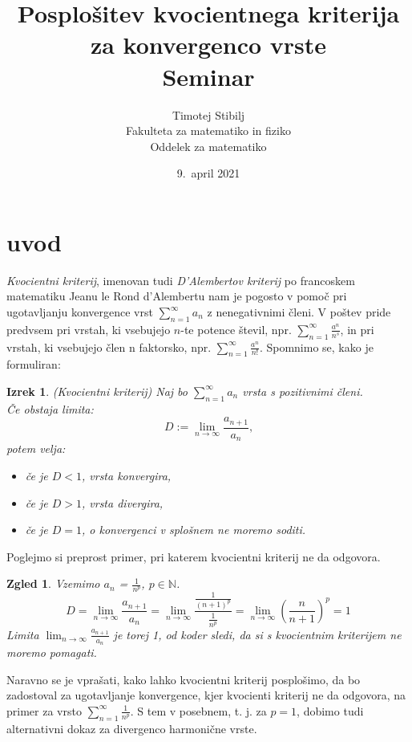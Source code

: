 \documentclass[a4paper,12pt]{article}
\title{Posplošitev kvocientnega kriterija za konvergenco vrste \\ 
\Large Seminar}
\author{Timotej Stibilj \\
Fakulteta za matematiko in fiziko \\
Oddelek za matematiko}
\date{9.\ april 2021}
\def\N{\mathbb{N}} %
\newtheorem{izrek}{Izrek}
\newtheorem{zgled}{Zgled}
\begin{document}
\maketitle

\section{uvod}

\emph{Kvocientni kriterij}, imenovan tudi \emph{D'Alembertov kriterij} po francoskem matematiku Jeanu le Rond d'Alembertu
nam je pogosto v pomoč pri ugotavljanju konvergence vrst $\sum_{n = 1}^{\infty}{a_n}$ z nenegativnimi členi. 
V poštev pride predvsem pri vrstah, ki vsebujejo $n$-te potence števil, npr. $\sum_{n = 1}^{\infty}{\frac{a^n}{n^s}}$, 
in pri vrstah, ki vsebujejo člen n faktorsko, npr. $\sum_{n = 1}^{\infty}{\frac{a^n}{n!}}$.
Spomnimo se, kako je formuliran:\\

\noindent
\begin{izrek}(Kvocientni kriterij) Naj bo $\sum_{n = 1}^{\infty}{a_n}$ vrsta s pozitivnimi členi.\\
    Če obstaja limita:
    \[
        D := \lim_{n \to \infty} \frac{a_{n + 1}}{a_n} \text{,}
    \]
    potem velja:
    \begin{itemize}
        \item če je $ D < 1 $, vrsta konvergira,
        \item če je $D > 1$, vrsta divergira,
        \item če je $D = 1$, o konvergenci v splošnem ne moremo soditi.
    \end{itemize}
\end{izrek}

Poglejmo si preprost primer, pri katerem kvocientni kriterij ne da odgovora.

\begin{zgled}
    Vzemimo $a_n$ = $\frac{1}{n^p}$, $p \in \N$.
    \[
        D = \lim_{n \to \infty} \frac{a_{n + 1}}{a_n}
        = \lim_{n \to \infty} \frac{\frac{1}{(n+1)^p}}{\frac{1}{n^p}}
        = \lim_{n \to \infty} \left( \frac{n}{n + 1} \right)^p
        = 1
    \]
    Limita $ \lim_{n \to \infty} \frac{a_{n + 1}}{a_n} $ je torej 1, od koder sledi, da si s kvocientnim kriterijem ne moremo pomagati.
\end{zgled}

Naravno se je vprašati, kako lahko kvocientni kriterij posplošimo, da bo zadostoval za ugotavljanje konvergence,
kjer kvocienti kriterij ne da odgovora, na primer za vrsto $\sum_{n = 1}^{\infty}{\frac{1}{n^p}}$.
S tem v posebnem, t. j. za $p = 1$, dobimo tudi alternativni dokaz za divergenco harmonične vrste.
\end{document}

